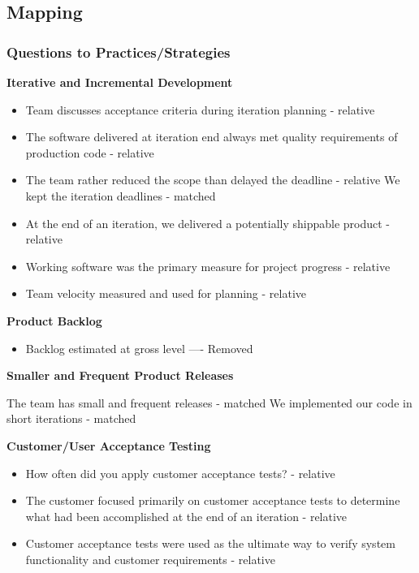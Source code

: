 \begin{appendices}
\chapter{Mapping}


\subsection{Questions to Practices/Strategies}

\textbf{Iterative and Incremental Development}
\begin{itemize}
	\taa Stories sufficiently elaborated prior to planning meetings - matched
	\item Team discusses acceptance criteria during iteration planning - relative
	\item The software delivered at iteration end always met quality requirements of production code - relative
	\item The team rather reduced the scope than delayed the deadline - relative 
	\pam We kept the iteration deadlines - matched
	\item At the end of an iteration, we delivered a potentially shippable product - relative
	\item Working software was the primary measure for project progress - relative
	\item Team velocity measured and used for planning - relative
\end{itemize}

\textbf{Product Backlog}
\begin{itemize}
	\taa Backlog prioritized and ranked by business value - matched
	\item Backlog estimated at gross level ---- Removed
\end{itemize}

\textbf{Smaller and Frequent Product Releases}
\begin{itemize}
	\taa The team has small and frequent releases - matched
	\pam We implemented our code in short iterations - matched
\end{itemize}

\textbf{Customer/User Acceptance Testing}
\begin{itemize}
	\item How often did you apply customer acceptance tests? - relative
	\item The customer focused primarily on customer acceptance tests to determine what had been accomplished at the end of an iteration - relative
	\item Customer acceptance tests were used as the ultimate way to verify system functionality and customer requirements - relative
\end{itemize}


\end{appendices}
